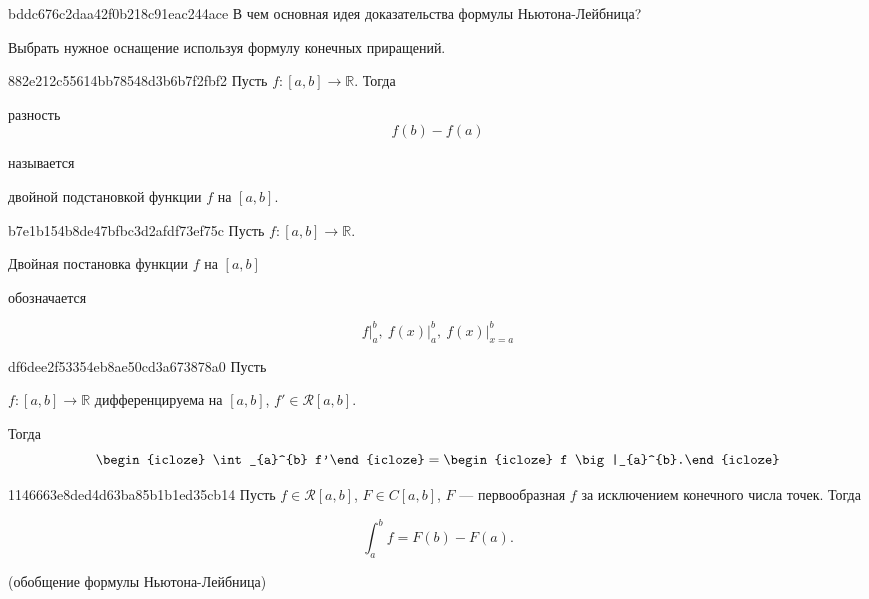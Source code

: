 \begin{note}{bddc676c2daa42f0b218c91eac244ace}
    В чем основная идея доказательства формулы Ньютона-Лейбница?

    \begin{cloze}{1}
        Выбрать нужное оснащение используя формулу конечных приращений.
    \end{cloze}
\end{note}

\begin{note}{882e212c55614bb78548d3b6b7f2fbf2}
    Пусть \({ f : [a, b] \to \mathbb R }\). Тогда
    \begin{icloze}{1}
        разность
        \[
            f(b) - f(a)
        \]
    \end{icloze}
    называется \begin{icloze}{2}двойной подстановкой функции \({ f }\)  на \({ [a, b] }\).\end{icloze}
\end{note}

\begin{note}{b7e1b154b8de47bfbc3d2afdf73ef75c}
    Пусть \({ f : [a, b] \to \mathbb R }\).
    \begin{icloze}{1}Двойная постановка функции \({ f }\) на \({ [a, b] }\)\end{icloze} обозначается
    \begin{icloze}{2}
        \[
            f \big|_{a}^{b},\: f(x) \big|_{a}^{b},\: f(x) \big|_{x = a}^{b}
        \]
    \end{icloze}
\end{note}

\begin{note}{df6dee2f53354eb8ae50cd3a673878a0}
    Пусть \begin{icloze}{3}\({ f : [a, b] \to \mathbb R }\) дифференцируема на \({ [a, b] }\), \({ f' \in \mathcal R[a, b] }\).\end{icloze} Тогда
    \[
        \begin{icloze}{2}\int_{a}^{b} f'\end{icloze} = \begin{icloze}{1}f \big|_{a}^{b}.\end{icloze}
    \]
\end{note}

\begin{note}{1146663e8ded4d63ba85b1b1ed35cb14}
    Пусть \({ f \in \mathcal R[a, b] }\), \({ F \in C[a, b] }\), \({ F }\) --- первообразная \({ f }\) за исключением конечного числа точек.
    Тогда
    \begin{icloze}{1}
        \[
            \int_{a}^{b} f = F(b) - F(a).
        \]
    \end{icloze}

    \begin{center}
        \tiny
        (обобщение формулы Ньютона-Лейбница)
    \end{center}
\end{note}


